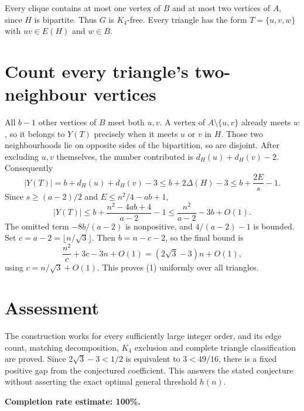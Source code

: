 \documentclass[11pt]{article}
\begin{document}
Every clique contains at most one vertex of $B$ and at most two vertices of $A$, since $H$ is bipartite. Thus $G$ is $K_4$-free. Every triangle has the form $T=\{u,v,w\}$ with $uv\in E(H)$ and $w\in B$.

\section*{Count every triangle's two-neighbour vertices}
All $b-1$ other vertices of $B$ meet both $u,v$. A vertex of $A\setminus\{u,v\}$ already meets $w$, so it belongs to $Y(T)$ precisely when it meets $u$ or $v$ in $H$. Those two neighbourhoods lie on opposite sides of the bipartition, so are disjoint. After excluding $u,v$ themselves, the number contributed is $d_H(u)+d_H(v)-2$. Consequently
\[
 |Y(T)|=b+d_H(u)+d_H(v)-3
 \le b+2\Delta(H)-3
 \le b+\frac{2E}{s}-1.
\]
Since $s\ge(a-2)/2$ and $E\le n^2/4-ab+1$,
\[
 |Y(T)|\le b+\frac{n^2-4ab+4}{a-2}-1
 \le\frac{n^2}{a-2}-3b+O(1).
\]
The omitted term $-8b/(a-2)$ is nonpositive, and $4/(a-2)-1$ is bounded. Set $c=a-2=\lfloor n/\sqrt3\rfloor$. Then $b=n-c-2$, so the final bound is
\[
 \frac{n^2}{c}+3c-3n+O(1)=(2\sqrt3-3)n+O(1),
\]
using $c=n/\sqrt3+O(1)$. This proves (1) uniformly over all triangles.

\section*{Assessment}
The construction works for every sufficiently large integer order, and its edge count, matching decomposition, $K_4$ exclusion and complete triangle classification are proved. Since $2\sqrt3-3<1/2$ is equivalent to $3<49/16$, there is a fixed positive gap from the conjectured coefficient. This answers the stated conjecture without asserting the exact optimal general threshold $h(n)$.

\textbf{Completion rate estimate: 100\%.}
\end{document}
